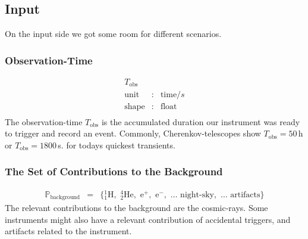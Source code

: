 \documentclass{article}%
\begin{document}
        \subsection{Input}
            On the input side we got some room for different scenarios.
        \subsubsection*{Observation-Time}
            \begin{eqnarray*}
                T_\text{obs} && \\
                \text{unit} &:& \text{time} / s\\
                \text{shape} &:& \text{float}\\
            \end{eqnarray*}
            The observation-time $T_\text{obs}$ is the accumulated duration our instrument was ready to trigger and record an event.
            Commonly, Cherenkov-telescopes show $T_\text{obs} = 50\,$h or $T_\text{obs} = 1800\,$s. for todays quickest transients.
        \subsubsection*{The Set of Contributions to the Background}
            \begin{eqnarray*}
                \mathbb{P}_\text{background} &=& \{
                {_1^1}\text{H},\,\,
                {_2^4}\text{He},\,\,
                \text{e}^{+},\,\,
                \text{e}^{-},\,\,
                \dots{}\,\,
                \text{night-sky},\,\,
                \dots{}\,\,
                \text{artifacts}
                \}
            \end{eqnarray*}
            The relevant contributions to the background are the cosmic-rays. Some instruments might also have a relevant contribution of accidental triggers, and artifacts related to the instrument.
\end{document}

